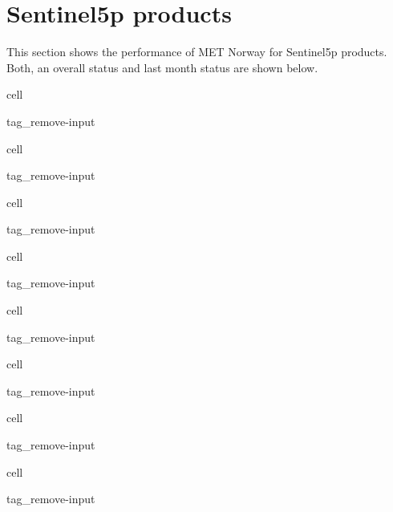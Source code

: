 \documentclass[letterpaper,10pt,english]{jupyterBook}
\begin{document}
\chapter{Sentinel\sphinxhyphen{}5p products}
\label{\detokenize{S5p_portals:sentinel-5p-products}}\label{\detokenize{S5p_portals::doc}}
\sphinxAtStartPar
This section shows the performance of MET Norway for Sentinel\sphinxhyphen{}5p products. Both, an overall status and last month status are shown below.

\begin{sphinxuseclass}{cell}
\begin{sphinxuseclass}{tag_remove-input}
\end{sphinxuseclass}
\end{sphinxuseclass}
\begin{sphinxuseclass}{cell}
\begin{sphinxuseclass}{tag_remove-input}
\end{sphinxuseclass}
\end{sphinxuseclass}
\begin{sphinxuseclass}{cell}
\begin{sphinxuseclass}{tag_remove-input}
\end{sphinxuseclass}
\end{sphinxuseclass}
\begin{sphinxuseclass}{cell}
\begin{sphinxuseclass}{tag_remove-input}
\end{sphinxuseclass}
\end{sphinxuseclass}
\begin{sphinxuseclass}{cell}
\begin{sphinxuseclass}{tag_remove-input}
\end{sphinxuseclass}
\end{sphinxuseclass}
\begin{sphinxuseclass}{cell}
\begin{sphinxuseclass}{tag_remove-input}
\end{sphinxuseclass}
\end{sphinxuseclass}
\begin{sphinxuseclass}{cell}
\begin{sphinxuseclass}{tag_remove-input}
\end{sphinxuseclass}
\end{sphinxuseclass}
\begin{sphinxuseclass}{cell}
\begin{sphinxuseclass}{tag_remove-input}
\end{sphinxuseclass}
\end{sphinxuseclass}
\end{document}
